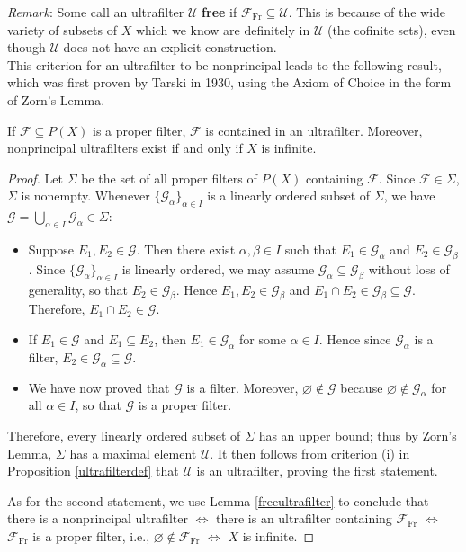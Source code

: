 \documentclass{article}
\def\F{\mathscr F}
\def\Frec{\mathscr F_{\mathrm{Fr}}}
\def\G{\mathscr G}
\def\U{\mathscr U}
\begin{document}
\noindent\emph{Remark}: Some call an ultrafilter $\U$ \textbf{free} if $\Frec\subseteq\U$.  This is because of the wide variety of subsets of $X$ which we know are definitely in $\U$ (the cofinite sets), even though $\U$ does not have an explicit construction.\\

\noindent This criterion for an ultrafilter to be nonprincipal leads to the following result, which was first proven by Tarski in 1930, using the Axiom of Choice in the form of Zorn's Lemma.
\begin{theorem}\label{filtembed}
If $\F\subseteq P(X)$ is a proper filter, $\F$ is contained in an ultrafilter.  Moreover, nonprincipal ultrafilters exist if and only if $X$ is infinite.
\end{theorem}
\begin{proof}
Let $\Sigma$ be the set of all proper filters of $P(X)$ containing $\F$.  Since $\F\in\Sigma$, $\Sigma$ is nonempty.  Whenever $\{\G_\alpha\}_{\alpha\in I}$ is a linearly ordered subset of $\Sigma$, we have $\G=\bigcup_{\alpha\in I}\G_\alpha\in\Sigma$:
\begin{itemize}
\item Suppose $E_1,E_2\in\G$.  Then there exist $\alpha,\beta\in I$ such that $E_1\in\G_\alpha$ and $E_2\in\G_\beta$.  Since $\{\G_\alpha\}_{\alpha\in I}$ is linearly ordered, we may assume $\G_\alpha\subseteq\G_\beta$ without loss of generality, so that $E_2\in\G_\beta$.  Hence $E_1,E_2\in\G_\beta$ and $E_1\cap E_2\in\G_\beta\subseteq\G$.  Therefore, $E_1\cap E_2\in\G$.

\item If $E_1\in\G$ and $E_1\subseteq E_2$, then $E_1\in\G_\alpha$ for some $\alpha\in I$.  Hence since $\G_\alpha$ is a filter, $E_2\in\G_\alpha\subseteq\G$.

\item We have now proved that $\G$ is a filter.  Moreover, $\varnothing\notin\G$ because $\varnothing\notin\G_\alpha$ for all $\alpha\in I$, so that $\G$ is a proper filter.
\end{itemize}
Therefore, every linearly ordered subset of $\Sigma$ has an upper bound; thus by Zorn's Lemma, $\Sigma$ has a maximal element $\U$.  It then follows from criterion (i) in Proposition \ref{ultrafilterdef} that $\U$ is an ultrafilter, proving the first statement.

As for the second statement, we use Lemma \ref{freeultrafilter} to conclude that there is a nonprincipal ultrafilter $\iff$ there is an ultrafilter containing $\Frec$ $\iff$ $\Frec$ is a proper filter, i.e., $\varnothing\notin\Frec$ $\iff$ $X$ is infinite.
\end{proof}
\end{document}
